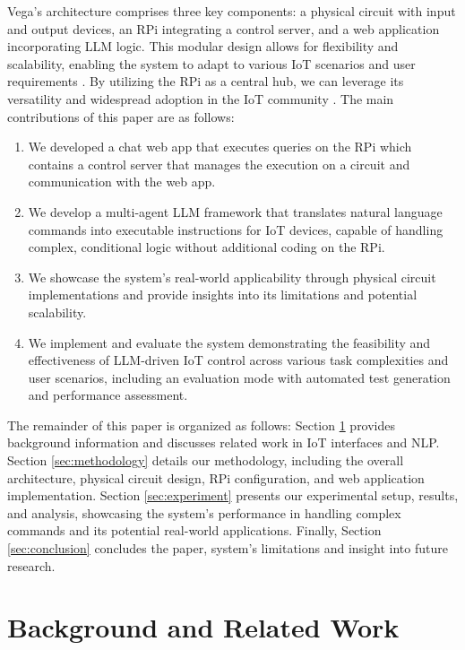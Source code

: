\documentclass{ieeeaccess}
\begin{document}
Vega's architecture comprises three key components: a physical circuit with input and output devices, an RPi integrating a control server, and a web application incorporating LLM logic. This modular design allows for flexibility and scalability, enabling the system to adapt to various IoT scenarios and user requirements \cite{taylor2010software}. By utilizing the RPi as a central hub, we can leverage its versatility and widespread adoption in the IoT community \cite{8067944}. The main contributions of this paper are as follows:

\begin{enumerate}
\item We developed a chat web app that executes queries on the RPi which contains a control server that manages the execution on a circuit and communication with the web app.
\item We develop a multi-agent LLM framework that translates natural language commands into executable instructions for IoT devices, capable of handling complex, conditional logic without additional coding on the RPi.
\item We showcase the system's real-world applicability through physical circuit implementations and provide insights into its limitations and potential scalability.
\item We implement and evaluate the system demonstrating the feasibility and effectiveness of LLM-driven IoT control across various task complexities and user scenarios, including an evaluation mode with automated test generation and performance assessment.
\end{enumerate}

The remainder of this paper is organized as follows: Section \ref{sec:background} provides background information and discusses related work in IoT interfaces and NLP. Section \ref{sec:methodology} details our methodology, including the overall architecture, physical circuit design, RPi configuration, and web application implementation. Section \ref{sec:experiment} presents our experimental setup, results, and analysis, showcasing the system's performance in handling complex commands and its potential real-world applications. Finally, Section \ref{sec:conclusion} concludes the paper, system's limitations and insight into future research.

\section{Background and Related Work}\label{sec:background}
\end{document}

